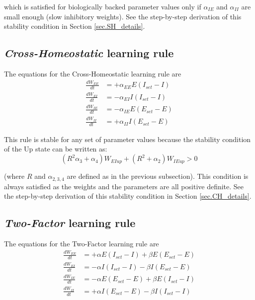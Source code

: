 \documentclass[
twocolumn,
]{article}
\newcommand{\EE}{\mathit{EE}}
\newcommand{\EI}{\mathit{EI}}
\newcommand{\IE}{\mathit{IE}}
\newcommand{\II}{\mathit{II}}
\newcommand{\set}{\mathit{set}}
\newcommand{\up}{\mathit{up}}
\begin{document}
\noindent which is satisfied for biologically backed parameter values only if $\alpha_{\IE}$ and $\alpha_{\II}$ are small enough (slow inhibitory weights). See the step-by-step derivation of this stability condition in Section \ref{sec.SH_details}.




\subsection{{\em Cross-Homeostatic} learning rule}

The equations for the Cross-Homeostatic learning rule are
\begin{equation}
\begin{aligned}
\frac{dW_{\EE}}{dt} & = +\alpha_{\EE} E (I_{\set} - I) \\
\frac{dW_{\EI}}{dt} & = -\alpha_{\EI} I (I_{\set} - I) \\
\frac{dW_{\IE}}{dt} & = -\alpha_{\IE} E (E_{\set} - E) \\
\frac{dW_{\II}}{dt} & = +\alpha_{\II} I (E_{\set} - E)
\end{aligned}
\label{eq.CH_summary}
\end{equation}

\noindent This rule is stable for any set of parameter values because the stability condition of the Up state can be written as:
\begin{equation}
(R^2 \alpha_3 + \alpha_4)W_{\EI\up} + (R^2 + \alpha_2)W_{\IE\up} > 0
\label{eq.CH_stable_cond_summary}
\end{equation}

\noindent (where $R$ and $\alpha_{2,3,4}$ are defined as in the previous subsection). This condition is always satisfied as the weights and the parameters are all positive definite. See the step-by-step derivation of this stability condition in Section \ref{sec.CH_details}.



\subsection{{\em Two-Factor} learning rule}

The equations for the Two-Factor learning rule are
\begin{equation}
\begin{aligned}
\frac{dW_{\EE}}{dt} & = +\alpha E (I_{\set} - I) + \beta E (E_{\set} - E) \\
\frac{dW_{\EI}}{dt} & = -\alpha I (I_{\set} - I) - \beta I (E_{\set} - E) \\
\frac{dW_{\IE}}{dt} & = -\alpha E (E_{\set} - E) + \beta E (I_{\set} - I) \\
\frac{dW_{\II}}{dt} & = +\alpha I (E_{\set} - E) - \beta I (I_{\set} - I)
\end{aligned}
\label{eq.TF_summary}
\end{equation}
\end{document}
